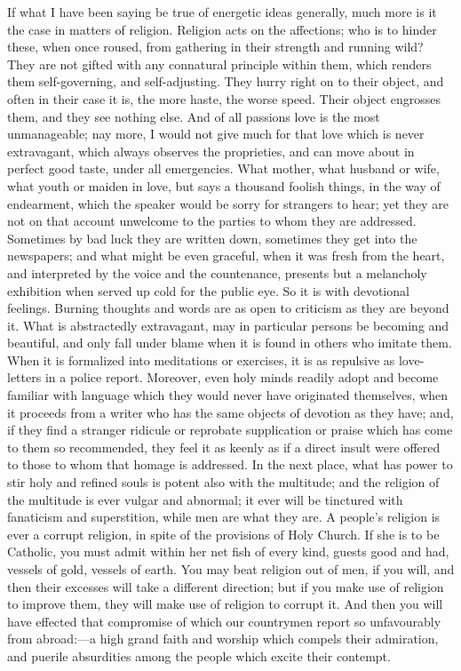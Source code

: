 If what I have been saying be true of energetic ideas generally, much
more is it the case in matters of religion. Religion acts on the
affections; who is to hinder these, when once roused, from gathering in
their strength and running wild? They are not gifted with any connatural
principle within them, which renders them self-governing, and
self-adjusting. They hurry right on to their object, and often in their
case it is, the more haste, the worse speed. Their object engrosses them, and they see nothing else. And of all passions love is the most
unmanageable; nay more, I would not give much for that love which is
never extravagant, which always observes the proprieties, and can move
about in perfect good taste, under all emergencies. What mother, what
husband or wife, what youth or maiden in love, but says a thousand
foolish things, in the way of endearment, which the speaker would be
sorry for strangers to hear; yet they are not on that account unwelcome
to the parties to whom they are addressed. Sometimes by bad luck they
are written down, sometimes they get into the newspapers; and what might
be even graceful, when it was fresh from the heart, and interpreted by
the voice and the countenance, presents but a melancholy exhibition when
served up cold for the public eye. So it is with devotional feelings.
Burning thoughts and words are as open to criticism as they are beyond
it. What is abstractedly extravagant, may in particular persons be
becoming and beautiful, and only fall under blame when it is found in
others who imitate them. When it is formalized into meditations or
exercises, it is as repulsive as love-letters in a police report.
Moreover, even holy minds readily adopt and become familiar with
language which they would never have originated themselves, when it
proceeds from a writer who has the same objects of devotion as they
have; and, if they find a stranger ridicule or reprobate supplication or
praise which has come to them so recommended, they feel it as keenly as
if a direct insult were offered to those to whom that homage is
addressed. In the next place, what has power to stir holy and
refined souls is potent also with the multitude; and the religion of the
multitude is ever vulgar and abnormal; it ever will be tinctured with
fanaticism and superstition, while men are what they are. A people's
religion is ever a corrupt religion, in spite of the provisions of Holy
Church. If she is to be Catholic, you must admit within her net fish of
every kind, guests good and had, vessels of gold, vessels of earth. You
may beat religion out of men, if you will, and then their excesses will
take a different direction; but if you make use of religion to improve
them, they will make use of religion to corrupt it. And then you will
have effected that compromise of which our countrymen report so
unfavourably from abroad:—a high grand faith and worship which compels
their admiration, and puerile absurdities among the people which excite
their contempt.


